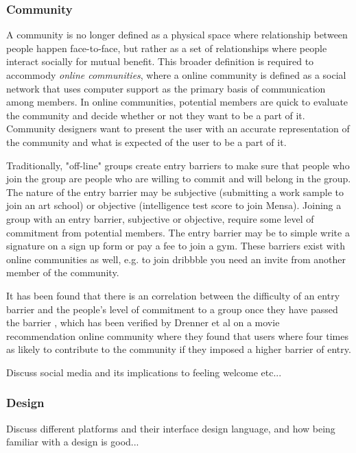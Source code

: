 \subsubsection{Community}

A community is no longer defined as a physical space where relationship between people happen face-to-face, but rather as a set of relationships where people interact socially for mutual benefit. This broader definition is required to accommody \textit{online communities}, where a online community is defined as a social network that uses computer support as the primary basis of communication among members.  In online communities, potential members are quick to evaluate the community and decide whether or not they want to be a part of it. Community designers want to present the user with an accurate representation of the community and what is expected of the user to be a part of it.

Traditionally, "off-line" groups create entry barriers to make sure that people who join the group are people who are willing to commit and will belong in the group. The nature of the entry barrier may be subjective (submitting a work sample to join an art school) or objective (intelligence test score to join Mensa). Joining a group with an entry barrier, subjective or objective, require some level of commitment from potential members. The entry barrier may be to simple write a signature on a sign up form or pay a fee to join a gym. These barriers exist with online communities as well, e.g. to join dribbble you need an invite from another member of the community.

It has been found that there is an correlation between the difficulty of an entry barrier and the people's level of commitment to a group once they have passed the barrier \cite{Aronson1959}, which has been verified by Drenner et al \cite{Drenner2008} on a movie recommendation online community where they found that users where four times as likely to contribute to the community if they imposed a higher barrier of entry.

Discuss social media and its implications to feeling welcome etc...
\subsubsection{Design}
Discuss different platforms and their interface design language, and how being familiar with a design is good...


